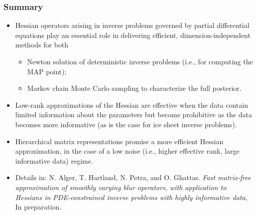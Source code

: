 \documentclass[10pt,final,xcolor=dvipsnames]{beamer}
\begin{document}
\begin{frame}
  \frametitle{Summary}

  \begin{itemize}
  \item Hessian operators arising in inverse problems governed by
    partial differential equations play an essential role in
    delivering efficient, dimension-independent methods for both
    \begin{itemize}
    \item Newton solution of deterministic inverse problems (i.e., for
      computing the MAP point);
      \vspace{0.05in}
    \item Markov chain Monte Carlo sampling to characterize the full
      posterior.
    \end{itemize}
    \vspace{0.05in}
  \item Low-rank approximations of the Hessian are effective when the
    data contain limited information about the parameters but become
    prohibitive as the data becomes more informative (as is the case
    for ice sheet inverse problems).
    \vspace{0.05in}
  \item Hierarchical matrix representations promise a more efficient
    Hessian approximation, in the case of a low noise (i.e., higher
    effective rank, large informative data) regime.
  \end{itemize}

  \begin{itemize}
  \item [] \scriptsize{Details in: N. Alger, T. Hartland, N. Petra,
    and O. Ghattas. {\em Fast matrix-free approximation of smoothly
      varying blur operators, with application to Hessians in
      PDE-constrained inverse problems with highly informative data},
    In preparation.}
  \end{itemize}
\end{frame}
\end{document}
